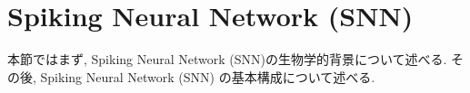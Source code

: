 \section{Spiking Neural Network (SNN)}
本節ではまず, Spiking Neural Network (SNN)の生物学的背景について述べる.
その後, Spiking Neural Network (SNN) の基本構成について述べる.



% 